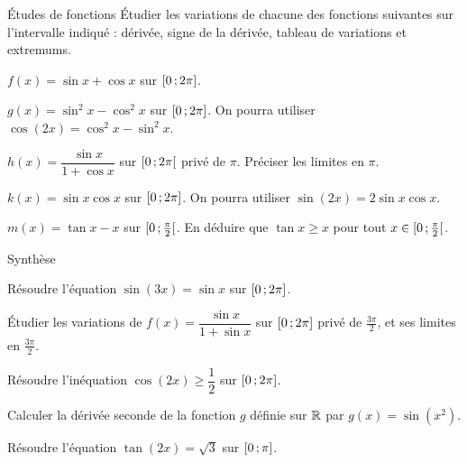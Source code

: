 
\begin{exercice}[3]{Études de fonctions}
Étudier les variations de chacune des fonctions suivantes sur l'intervalle indiqué : dérivée, signe de la dérivée,
tableau de variations et extremums.
\begin{questions}
  \item $f(x)=\sin x+\cos x$ sur $\mathopen{[}0\,{;}\,2\pi\mathclose{]}$.
  \item $g(x)=\sin^{2}x-\cos^{2}x$ sur $\mathopen{[}0\,{;}\,2\pi\mathclose{]}$. On pourra utiliser $\cos(2x)=\cos^{2}x-\sin^{2}x$.
  \item $h(x)=\dfrac{\sin x}{1+\cos x}$ sur $\mathopen{[}0\,{;}\,2\pi\mathclose{[}$ privé de $\pi$. Préciser les limites en $\pi$.
  \item $k(x)=\sin x\cos x$ sur $\mathopen{[}0\,{;}\,2\pi\mathclose{]}$. On pourra utiliser $\sin(2x)=2\sin x\cos x$.
  \item $m(x)=\tan x-x$ sur $\mathopen{[}0\,{;}\,\frac{\pi}{2}\mathclose{[}$. En déduire que $\tan x\geq x$ pour tout $x\in\mathopen{[}0\,{;}\,\frac{\pi}{2}\mathclose{[}$.
\end{questions}
\end{exercice}

\begin{exercice}[3]{Synthèse}
\begin{questions}
  \item Résoudre l'équation $\sin(3x)=\sin x$ sur $\mathopen{[}0\,{;}\,2\pi\mathclose{]}$.
  \item Étudier les variations de $f(x)=\dfrac{\sin x}{1+\sin x}$ sur $\mathopen{[}0\,{;}\,2\pi\mathclose{]}$ privé de $\frac{3\pi}{2}$, et ses limites en $\frac{3\pi}{2}$.
  \item Résoudre l'inéquation $\cos(2x)\geq\dfrac12$ sur $\mathopen{[}0\,{;}\,2\pi\mathclose{]}$.
  \item Calculer la dérivée seconde de la fonction $g$ définie sur $\mathbb{R}$ par $g(x)=\sin\left(x^{2}\right)$.
  \item Résoudre l'équation $\tan(2x)=\sqrt3$ sur $\mathopen{[}0\,{;}\,\pi\mathclose{]}$.
\end{questions}
\end{exercice}

